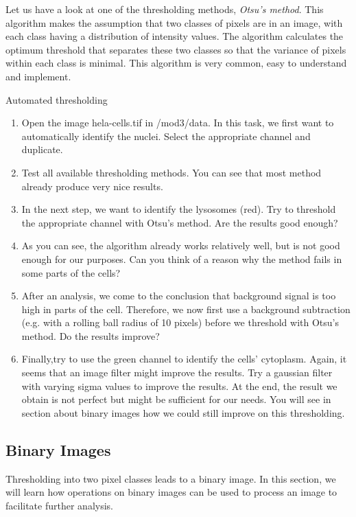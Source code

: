 Let us have a look at one of the thresholding methods, \emph{ Otsu's method}. This algorithm makes the assumption that two classes of pixels are in an image, with each class having a distribution of intensity values. The algorithm calculates the optimum threshold that separates these two classes so that the variance of pixels within each class is minimal. This algorithm is very common, easy to understand and implement. 

\begin{taskbox}{Automated thresholding}
\begin{enumerate}
	\item Open the image hela-cells.tif in /mod3/data. In this task, we first want to automatically identify the nuclei. Select the appropriate channel and duplicate. 
	\item Test all available thresholding methods. You can see that most method already produce very nice results.
	\item In the next step, we want to identify the lysosomes (red). Try to threshold the appropriate channel with Otsu's method. Are the results good enough?
	\item As you can see, the algorithm already works relatively well, but is not good enough for our purposes. Can you think of a reason why the method fails in some parts of the cells? 
	\item After an analysis, we come to the conclusion that background signal is too high in parts of the cell. Therefore, we now first use a background subtraction (e.g. with a rolling ball radius of 10 pixels) before we threshold with Otsu's method. Do the results improve?
	\item Finally,try to use the green channel to identify the cells' cytoplasm. Again, it seems that an image filter might improve the results. Try a gaussian filter with varying sigma values to improve the results. At the end, the result we obtain is not perfect but might be sufficient for our needs. You will see in section about binary images how we could still improve on this thresholding. 
	\end{enumerate}
\end{taskbox}

\subsection{Binary Images}
Thresholding into two pixel classes leads to a binary image. In this section, we will learn how operations on binary images can be used to process an image to facilitate further analysis. 

